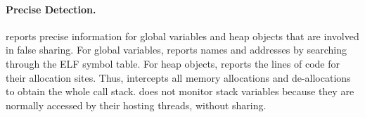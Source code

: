 \paragraph{Precise Detection.} \Cheetah{} reports precise information for global variables and heap objects that are involved in false sharing. For global variables, \Cheetah{} reports names and addresses by searching through the ELF symbol table. For heap objects, \Cheetah{} reports the lines of code for their allocation sites. Thus, \Cheetah{} intercepts all memory allocations and de-allocations to obtain the whole call stack. \cheetah{} does not monitor stack variables because they are normally accessed by their hosting threads, without sharing. 

 
